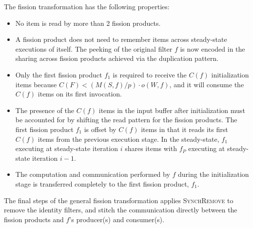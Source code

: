 The fission transformation has the following properties:
\begin{itemize}
\item No item is read by more than 2 fission products.
\item A fission product does not need to remember items across
  steady-state executions of itself. The peeking of the original
  filter $f$ is now encoded in the sharing across fission products
  achieved via the duplication pattern.
\item Only the first fission product $f_1$ is required to receive the $C(f)$
  initialization  items because $C(F) < (M(S,f) / p) \cdot o(W, f)$,
  and it will consume the $C(f)$ items on its first invocation.
\item The presence of the $C(f)$ items in the input buffer after
  initialization must be accounted for by shifting the read pattern
  for the fission products.  The first fission product $f_1$ is offset by
  $C(f)$ items in that it reads its first $C(f)$ items from the
  previous execution stage.  In the steady-state, $f_1$ executing at
  steady-state iteration $i$ shares items with $f_P$ executing at
  steady-state iteration $i-1$.
\item The computation and communication performed by $f$ during the
  initialization stage is transferred completely to the first fission
  product, $f_1$.  
\end{itemize}

The final steps of the general fission transformation applies
\textsc{SynchRemove} to remove the identity filters, and stitch the
communication directly between the fission products and $f$'s
producer(s) and consumer(s).
 
